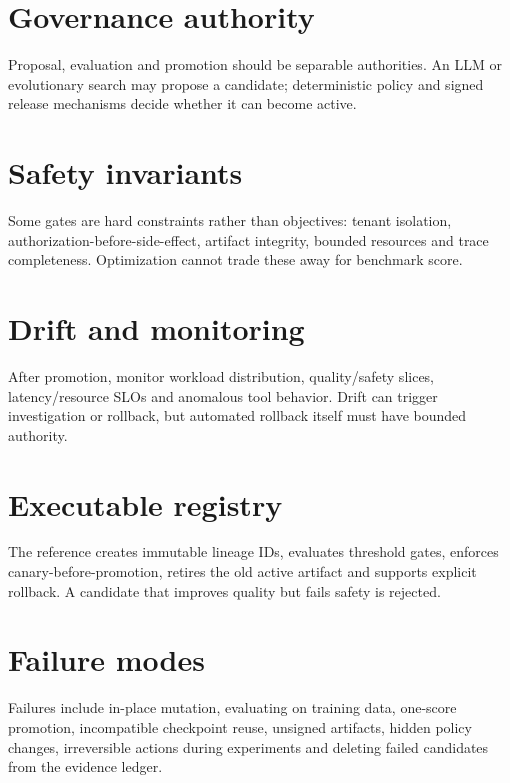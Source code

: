 \section{Governance authority}
Proposal, evaluation and promotion should be separable authorities. An LLM or evolutionary search may propose a candidate; deterministic policy and signed release mechanisms decide whether it can become active.

\section{Safety invariants}
Some gates are hard constraints rather than objectives: tenant isolation, authorization-before-side-effect, artifact integrity, bounded resources and trace completeness. Optimization cannot trade these away for benchmark score.

\section{Drift and monitoring}
After promotion, monitor workload distribution, quality/safety slices, latency/resource SLOs and anomalous tool behavior. Drift can trigger investigation or rollback, but automated rollback itself must have bounded authority.

\section{Executable registry}
The reference creates immutable lineage IDs, evaluates threshold gates, enforces canary-before-promotion, retires the old active artifact and supports explicit rollback. A candidate that improves quality but fails safety is rejected.

\section{Failure modes}
Failures include in-place mutation, evaluating on training data, one-score promotion, incompatible checkpoint reuse, unsigned artifacts, hidden policy changes, irreversible actions during experiments and deleting failed candidates from the evidence ledger.

